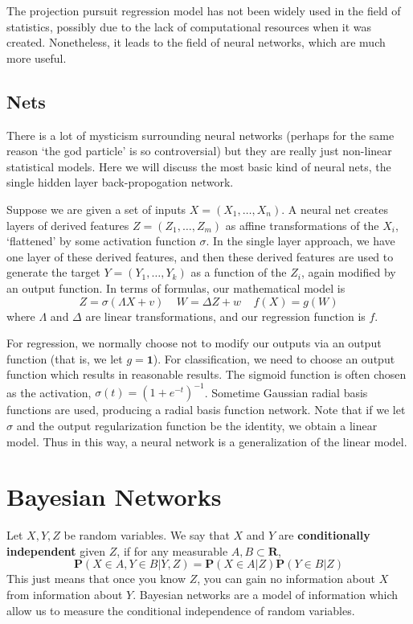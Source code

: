 The projection pursuit regression model has not been widely used in the field of statistics, possibly due to the lack of computational resources when it was created. Nonetheless, it leads to the field of neural networks, which are much more useful.

\section{Nets}

There is a lot of mysticism surrounding neural networks (perhaps for the same reason `the god particle' is so controversial) but they are really just non-linear statistical models. Here we will discuss the most basic kind of neural nets, the single hidden layer back-propogation network.

Suppose we are given a set of inputs $X = (X_1, \dots, X_n)$. A neural net creates layers of derived features $Z = (Z_1, \dots, Z_m)$ as affine transformations of the $X_i$, `flattened' by some activation function $\sigma$. In the single layer approach, we have one layer of these derived features, and then these derived features are used to generate the target $Y = (Y_1, \dots, Y_k)$ as a function of the $Z_i$, again modified by an output function. In terms of formulas, our mathematical model is
%
\[ Z = \sigma(\Lambda X + v)\ \ \ \ \ W = \Delta Z + w\ \ \ \ \ f(X) = g(W) \]
%
where $\Lambda$ and $\Delta$ are linear transformations, and our regression function is $f$.

For regression, we normally choose not to modify our outputs via an output function (that is, we let $g = \mathbf{1}$). For classification, we need to choose an output function which results in reasonable results. The sigmoid function is often chosen as the activation, $\sigma(t) = (1 + e^{-t})^{-1}$. Sometime Gaussian radial basis functions are used, producing a radial basis function network. Note that if we let $\sigma$ and the output regularization function be the identity, we obtain a linear model. Thus in this way, a neural network is a generalization of the linear model.

\chapter{Bayesian Networks}

Let $X,Y,Z$ be random variables. We say that $X$ and $Y$ are {\bf conditionally independent} given $Z$, if for any measurable $A,B \subset \mathbf{R}$,
%
\[ \mathbf{P}(X \in A,Y \in B|Y,Z) = \mathbf{P}(X \in A|Z)\mathbf{P}(Y \in B|Z) \]
%
This just means that once you know $Z$, you can gain no information about $X$ from information about $Y$. Bayesian networks are a model of information which allow us to measure the conditional independence of random variables.

